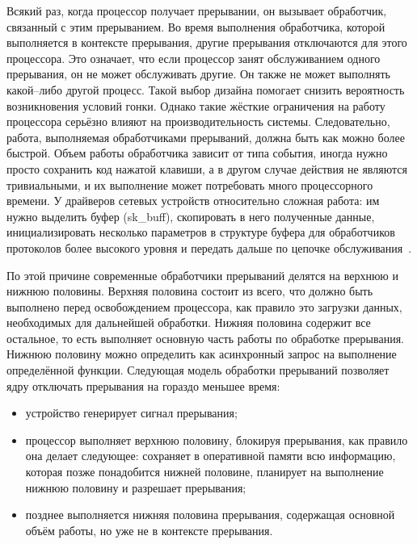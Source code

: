 Всякий раз, когда процессор получает прерывании, он вызывает обработчик, связанный с этим прерыванием. Во время выполнения обработчика, которой выполняется в контексте прерывания, другие прерывания отключаются для этого процессора. Это означает, что если процессор занят обслуживанием одного прерывания, он не может обслуживать другие. Он также не может выполнять какой--либо другой процесс. Такой выбор дизайна помогает снизить вероятность возникновения условий гонки. Однако такие жёсткие ограничения на работу процессора серьёзно влияют на производительность системы. Следовательно, работа, выполняемая обработчиками прерываний, должна быть как можно более быстрой. Объем работы обработчика  зависит от типа события, иногда нужно просто сохранить код нажатой клавиши, а в другом случае действия не являются тривиальными, и их выполнение может потребовать много процессорного времени. У драйверов сетевых устройств относительно сложная работа: им нужно выделить буфер (sk\_buff), скопировать в него полученные данные, инициализировать несколько параметров в структуре буфера для обработчиков протоколов более высокого уровня и передать дальше по цепочке обслуживания~\cite{net}. 

По этой причине современные обработчики прерываний делятся на верхнюю и нижнюю половины. Верхняя половина состоит из всего, что должно быть выполнено перед освобождением процессора, как правило это загрузки данных, необходимых для дальнейшей обработки. Нижняя половина содержит все остальное, то есть выполняет основную часть работы по обработке прерывания. Нижнюю половину можно определить как асинхронный запрос на выполнение определённой
функции. Следующая модель обработки прерываний позволяет ядру отключать прерывания на гораздо меньшее время:
\begin{itemize}[label=---]
	\item устройство генерирует сигнал прерывания;
	\item процессор выполняет верхнюю половину, блокируя прерывания, как правило она делает следующее: сохраняет в оперативной памяти всю информацию, которая позже понадобится нижней половине, планирует на выполнение нижнюю половину и разрешает прерывания;
	\item позднее выполняется нижняя половина прерывания, содержащая основной объём работы, но уже не в контексте прерывания.
\end{itemize}

